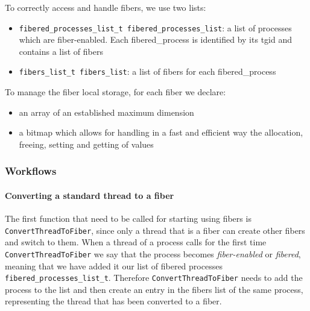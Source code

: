 \documentclass[a4paper,10pt]{article}
\begin{document}
  To correctly access and handle fibers, we use two lists:
  \begin{itemize}
    \item \lstinline{fibered_processes_list_t fibered_processes_list}: a list of processes which are fiber-enabled. Each fibered\_process is identified by its tgid and contains a list of fibers
    \item \lstinline{fibers_list_t fibers_list}: a list of fibers for each fibered\_process
  \end{itemize}

  To manage the fiber local storage, for each fiber we declare:
  \begin{itemize}
    \item an array of an established maximum dimension
    \item a bitmap which allows for handling in a fast and efficient way the allocation, freeing, setting and getting of values
  \end{itemize}

\subsubsection{Workflows}
  \paragraph{Converting a standard thread to a fiber}
    The first function that need to be called for starting using fibers is \lstinline{ConvertThreadToFiber}, since only a thread that is a fiber can create other fibers and switch to them. When a thread of a process calls for the first time \lstinline{ConvertThreadToFiber} we say that the process becomes \textit{fiber-enabled} or \textit{fibered}, meaning that we have added it our list of fibered processes \lstinline{fibered_processes_list_t}. Therefore \lstinline{ConvertThreadToFiber} needs to add the process to the list and then create an entry in the fibers list of the same process, representing the thread that has been converted to a fiber.
\end{document}
